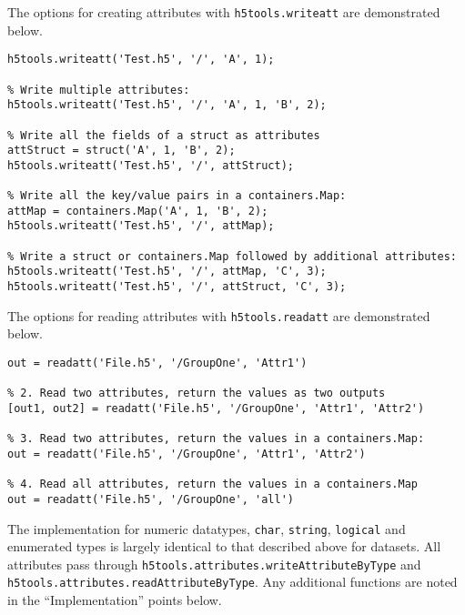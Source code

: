 \documentclass[11pt]{exam}
\newcommand\myfcn[1]{\colorbox{codegray}{\textcolor{codeblue}{\texttt{#1}}}}
\begin{document}
        The options for creating attributes with \myfcn{h5tools.writeatt} are demonstrated below. 
		\begin{lstlisting}[style=matlab-editor, basicstyle=\mlttfamily\footnotesize]
% Write a single attribute:
h5tools.writeatt('Test.h5', '/', 'A', 1);

% Write multiple attributes:
h5tools.writeatt('Test.h5', '/', 'A', 1, 'B', 2);

% Write all the fields of a struct as attributes
attStruct = struct('A', 1, 'B', 2);
h5tools.writeatt('Test.h5', '/', attStruct);

% Write all the key/value pairs in a containers.Map:
attMap = containers.Map('A', 1, 'B', 2);
h5tools.writeatt('Test.h5', '/', attMap);

% Write a struct or containers.Map followed by additional attributes:
h5tools.writeatt('Test.h5', '/', attMap, 'C', 3);
h5tools.writeatt('Test.h5', '/', attStruct, 'C', 3);
		\end{lstlisting}
        The options for reading attributes with \myfcn{h5tools.readatt}  are demonstrated below. 
		\begin{lstlisting}[style=matlab-editor, basicstyle=\mlttfamily\footnotesize]
% 1. Read a single attribute, return the value
out = readatt('File.h5', '/GroupOne', 'Attr1')

% 2. Read two attributes, return the values as two outputs
[out1, out2] = readatt('File.h5', '/GroupOne', 'Attr1', 'Attr2')

% 3. Read two attributes, return the values in a containers.Map:
out = readatt('File.h5', '/GroupOne', 'Attr1', 'Attr2')

% 4. Read all attributes, return the values in a containers.Map
out = readatt('File.h5', '/GroupOne', 'all')
		\end{lstlisting}

		\noindent The implementation for numeric datatypes, \texttt{char}, \texttt{string}, \texttt{logical} and enumerated types is largely identical to that described above for datasets. 
        All attributes pass through \myfcn{h5tools.attributes.writeAttributeByType} and \myfcn{h5tools.attributes.readAttributeByType}. Any additional functions are noted in the ``Implementation'' points below.
		
\end{document}
